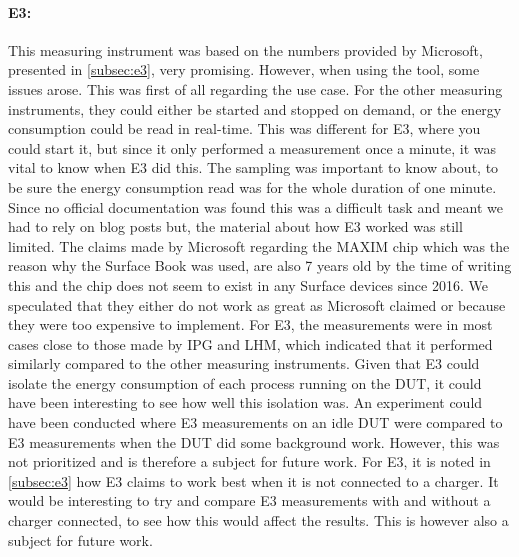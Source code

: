 \paragraph*{E3:} This measuring instrument was based on the numbers provided by Microsoft, presented in \cref{subsec:e3}, very promising. However, when using the tool, some issues arose. This was first of all regarding the use case. For the other measuring instruments, they could either be started and stopped on demand, or the energy consumption could be read in real-time. This was different for E3, where you could start it, but since it only performed a measurement once a minute, it was vital to know when E3 did this. The sampling was important to know about, to be sure the energy consumption read was for the whole duration of one minute. Since no official documentation was found this was a difficult task and meant we had to rely on blog posts but, the material about how E3 worked was still limited.
The claims made by Microsoft regarding the MAXIM chip which was the reason why the Surface Book was used, are also 7 years old by the time of writing this and the chip does not seem to exist in any Surface devices since 2016. We speculated that they either do not work as great as Microsoft claimed or because they were too expensive to implement. For E3, the measurements were in most cases close to those made by IPG and LHM, which indicated that it performed similarly compared to the other measuring instruments. Given that E3 could isolate the energy consumption of each process running on the DUT, it could have been interesting to see how well this isolation was. An experiment could have been conducted where E3 measurements on an idle DUT were compared to E3 measurements when the DUT did some background work. However, this was not prioritized and is therefore a subject for future work. For E3, it is noted in \cref{subsec:e3} how E3 claims to work best when it is not connected to a charger. It would be interesting to try and compare E3 measurements with and without a charger connected, to see how this would affect the results. This is however also a subject for future work.



